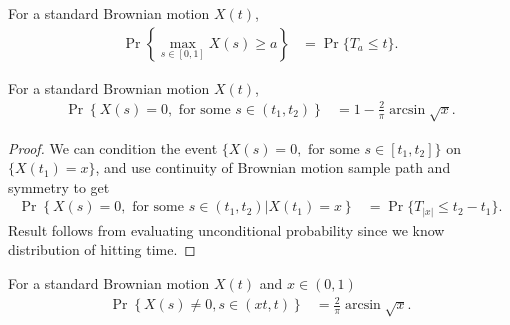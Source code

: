 \documentclass[a4paper,10pt,english]{article}
\begin{document}
\begin{rem} For a standard Brownian motion $X(t)$, 
\begin{align*}
\Pr\left\{\max_{s \in [0,1]}X(s) \geq a \right\} &= \Pr\{T_a \leq t\}.
\end{align*}
\end{rem}
\begin{thm} For a standard Brownian motion $X(t)$, 
\begin{align*}
\Pr\left\{  X(s) = 0, \text{ for some }s \in (t_1,t_2) \right\} &= 1 - \frac{2}{\pi}\arcsin\sqrt{x}.
\end{align*}
\end{thm}
\begin{proof} We can condition the event $\{ X(s) = 0, \text{ for some }s \in [t_1,t_2] \}$ on $\{X(t_1) = x\}$, and use continuity of Brownian motion sample path and symmetry to get
\begin{align*}
\Pr\left\{X(s) = 0, \text{ for some }s \in (t_1,t_2) | X(t_1) = x\right\} &= \Pr\{T_{|x|} \leq t_2 - t_1\}.
\end{align*}
Result follows from evaluating unconditional probability since we know distribution of hitting time.
\end{proof}

\begin{cor} For a standard Brownian motion $X(t)$ and $x \in (0,1)$
\begin{align*}
\Pr\left\{  X(s) \neq 0, s \in (xt,t) \right\} &= \frac{2}{\pi}\arcsin\sqrt{x}.
\end{align*}
\end{cor}
\end{document}
